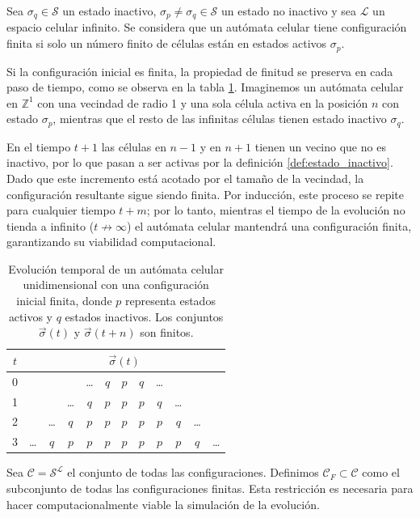 \begin{definition}	
	Sea $\sigma_q \in \mathcal{S}$ un estado inactivo, $\sigma_p \neq \sigma_q \in \mathcal{S}$ un estado no inactivo y sea $\mathcal{L}$ un espacio celular infinito. Se considera que un autómata celular tiene configuración finita si solo un número finito de células están en estados activos $\sigma_p$.
\end{definition}

Si la configuración inicial es finita, la propiedad de finitud se preserva en cada paso de tiempo, como se observa en la tabla \ref{tab:CA_finito}. Imaginemos un autómata celular en $\mathbb{Z}^1$ con una vecindad de radio 1 y una sola célula activa en la posición $n$ con estado $\sigma_p$, mientras que el resto de las infinitas células tienen estado inactivo $\sigma_q$. 

En el tiempo $t + 1$ las células en $n - 1$ y en $n + 1$ tienen un vecino que no es inactivo, por lo que pasan a ser activas por la definición \ref{def:estado_inactivo}. Dado que este incremento está acotado por el tamaño de la vecindad, la configuración resultante sigue siendo finita. Por inducción, este proceso se repite para cualquier tiempo $t + m$; por lo tanto, mientras el tiempo de la evolución no tienda a infinito ($t \not\to \infty $) el autómata celular mantendrá una configuración finita, garantizando su viabilidad computacional.

\begin{table}[H]
	\centering
	\begin{tabular}{c | c c c c c c c c c c c} 
		$t$ & \multicolumn{11}{c}{ $\vec{\sigma}(t)$  } \\ \hline \hline
		0 & && & \dots & $q$ & $p$ & $q$ & \dots & && \\ \hline
		1 & & & \dots & $q$ & $p$ & $p$&  $p$ & $q$ & \dots & & \\ \hline
		2  & & \dots & $q$  & $p$ & $p$ & $p$&  $p$ &  $p$& $q$ & \dots &  \\ \hline
		3 & \dots & $q$  & $p$ & $p$ & $p$&  $p$&$p$ &$p$& $p$ & $q$ & \dots \\
	\end{tabular}
	\caption{Evolución temporal de un autómata celular unidimensional con una configuración inicial finita, donde $p$ representa estados activos y $q$ estados inactivos. Los conjuntos $\vec{\sigma} (t)$ y $\vec{\sigma} (t + n)$ son finitos.}
	\label{tab:CA_finito}
\end{table}

Sea $\mathcal{C} =  \mathcal{S}^\mathcal{L}$ el conjunto de todas las configuraciones. Definimos $\mathcal{C}_F \subset \mathcal{C}$ como el subconjunto de todas las configuraciones finitas. Esta restricción es necesaria para hacer computacionalmente viable la simulación de la evolución.

